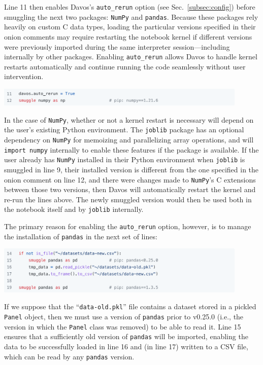 \documentclass[preprint,12pt,a4paper]{elsarticle}
\begin{document}
Line 11 then enables
Davos's \texttt{auto\_rerun} option (see Sec.~\ref{subsec:config}) before smuggling the next
two packages: \texttt{NumPy} and
\texttt{pandas}. Because these packages rely heavily on custom C data
types, loading the particular versions specified in their onion comments may
require restarting the notebook kernel if different versions were previously
imported during the same interpreter session---including internally by other packages.
Enabling \texttt{auto\_rerun} allows Davos to handle kernel restarts automatically and continue running the code seamlessly without user intervention.
\begin{center}
\includegraphics[width=0.9\textwidth]{figs/example3}
\end{center}
In the case of \texttt{NumPy}, whether or not a kernel restart is necessary will depend on the user's existing Python environment.
The \texttt{joblib} package has an optional dependency on \texttt{NumPy} for memoizing and parallelizing array operations, and will \texttt{import numpy} internally to enable these features if the package is available.
If the user already has \texttt{NumPy} installed in their Python environment when \texttt{joblib} is smuggled in line 9, their installed version is different from the one specified in the onion comment on line 12, and there were changes made to \texttt{NumPy}'s C extensions between those two versions, then Davos will automatically restart the kernel and re-run the lines above.
The newly smuggled version would then be used both in the notebook itself and by \texttt{joblib} internally.

The primary reason for enabling the \texttt{auto\_rerun} option, however, is to manage the installation of \texttt{pandas} in the next set of lines:
\begin{center}
\includegraphics[width=0.9\textwidth]{figs/example4}
\end{center}
If we suppose that the ``\texttt{data-old.pkl}'' file contains a dataset
stored in a pickled \texttt{Panel} object, then we must use a version of
\texttt{pandas} prior to v0.25.0 (i.e., the version in which the \texttt{Panel}
class was removed) to be able to read it. Line 15 ensures
that a sufficiently old version of \texttt{pandas} will be imported, enabling
the data to be successfully loaded in line 16 and (in line 17) written to a CSV
file, which can be read by any \texttt{pandas} version.
\end{document}
